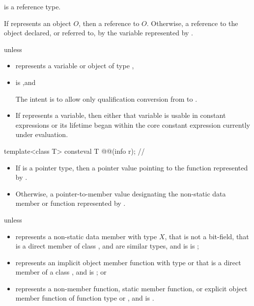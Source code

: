 \begin{itemdescr}
\pnum
\begin{note}
 is a reference type.
\end{note}

\pnum
\returns
If  represents an object $O$,
then a reference to $O$.
Otherwise, a reference to the object declared, or referred to,
by the variable represented by .

\pnum
\throws
{} unless
\begin{itemize}
\item
   represents a variable or object of type ,
\item
  is ,\newline and
  \begin{note}
  The intent is to allow only qualification conversion from  to .
  \end{note}
\item
  If  represents a variable,
  then either that variable is usable in constant expressions
  or its lifetime began within the core constant expression currently under evaluation.
\end{itemize}
\end{itemdescr}

\begin{itemdecl}
template<class T>
  consteval T @@(info r);       // \expos
\end{itemdecl}

\begin{itemdescr}
\pnum
\returns
\begin{itemize}
\item
  If  is a pointer type,
  then a pointer value pointing to the function represented by .
\item
  Otherwise, a pointer-to-member value
  designating the non-static data member or function represented by .
\end{itemize}

\pnum
\throws
{} unless
\begin{itemize}
\item
   represents a non-static data member with type $X$,
  that is not a bit-field,
  that is a direct member of class ,
   and  are similar types, and
   is  is ;
\item
   represents an implicit object member function
  with type  or 
  that is a direct member of a class ,
  and  is ; or
\item
   represents a non-member function,
  static member function, or
  explicit object member function
  of function type  or ,
  and  is .
\end{itemize}
\end{itemdescr}

